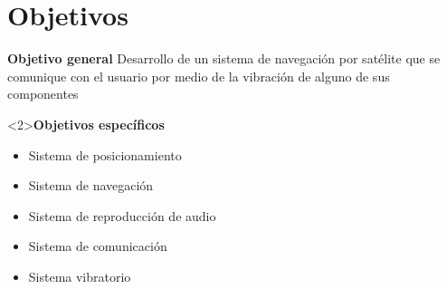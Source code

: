 \section{Objetivos}

\begin{slide}
  \begin{block}{\textbf{Objetivo general}}
    Desarrollo de un sistema de navegación por satélite que se comunique con el usuario por medio de
    la vibración de alguno de sus componentes
  \end{block}
  \begin{block}<2>{\textbf{Objetivos específicos}}
    \begin{itemize}
      \item Sistema de posicionamiento
      \item Sistema de navegación
      \item Sistema de reproducción de audio
      \item Sistema de comunicación
      \item Sistema vibratorio
    \end{itemize}
  \end{block}
\end{slide}

